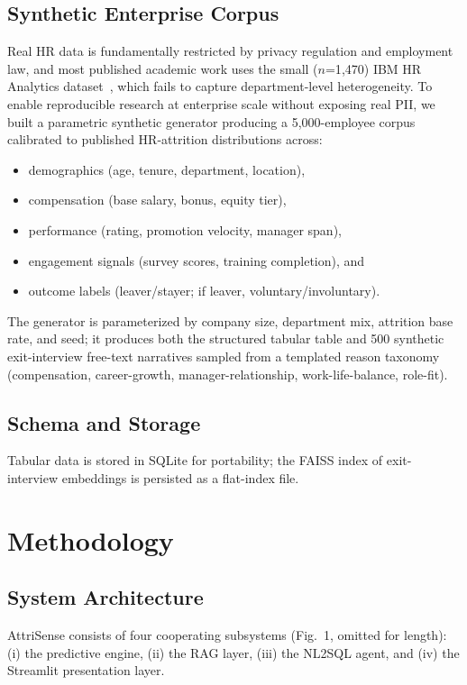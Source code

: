 \documentclass[conference]{IEEEtran}
\begin{document}
\subsection{Synthetic Enterprise Corpus}
Real HR data is fundamentally restricted by privacy regulation and
employment law, and most published academic work uses the small
($n$=1{,}470) IBM HR Analytics dataset~\cite{ibm2017}, which fails to
capture department-level heterogeneity. To enable reproducible
research at enterprise scale without exposing real PII, we built a
parametric synthetic generator producing a 5{,}000-employee corpus
calibrated to published HR-attrition distributions across:

\begin{itemize}
\item demographics (age, tenure, department, location),
\item compensation (base salary, bonus, equity tier),
\item performance (rating, promotion velocity, manager span),
\item engagement signals (survey scores, training completion), and
\item outcome labels (leaver/stayer; if leaver, voluntary/involuntary).
\end{itemize}

The generator is parameterized by company size, department mix,
attrition base rate, and seed; it produces both the structured
tabular table and 500 synthetic exit-interview free-text narratives
sampled from a templated reason taxonomy (compensation,
career-growth, manager-relationship, work-life-balance, role-fit).

\subsection{Schema and Storage}
Tabular data is stored in SQLite for portability; the FAISS index
of exit-interview embeddings is persisted as a flat-index file.

\section{Methodology}

\subsection{System Architecture}
AttriSense consists of four cooperating subsystems
(Fig.~1, omitted for length): (i) the predictive engine, (ii) the
RAG layer, (iii) the NL2SQL agent, and (iv) the Streamlit
presentation layer.
\end{document}
